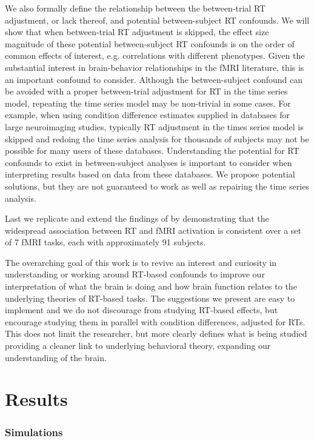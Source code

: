 \documentclass[titlepage,12pt] {article}
\begin{document}
We also formally define the relationship between the between-trial RT adjustment, or lack thereof, and potential between-subject RT confounds.  We will show that when between-trial RT adjustment is skipped, the effect size magnitude of these potential between-subject RT confounds is on the order of common effects of interest,  e.g. correlations with different phenotypes.  Given the substantial interest in brain-behavior relationships in the fMRI literature, this is an important confound to consider.   Although the between-subject confound can be avoided with a proper between-trial adjustment for RT in the time series model, repeating the time series model may be non-trivial in some cases.  For example, when using condition difference estimates supplied in databases for large neuroimaging studies, typically RT adjustment in the times series model is skipped and redoing the time series analysis for thousands of subjects may not be possible for many users of these databases.  Understanding the potential for RT confounds to exist in between-subject analyses is important to consider when interpreting results based on data from these databases.  We propose potential solutions, but they are not guaranteed to work as well as repairing the time series analysis.

Last we replicate and extend the findings of \citet{yarkoni_bold_2009} by demonstrating that the widespread association between RT and fMRI activation is consistent over a set of 7 fMRI tasks, each with approximately 91 subjects.  

The overarching goal of this work is to revive an interest and curiosity in understanding or working around RT-based confounds to improve our interpretation of what the brain is doing and how brain function relates to the underlying theories of RT-based tasks. The suggestions we present are easy to implement and we do not discourage from studying RT-based effects, but encourage studying them in parallel with condition differences, adjusted for RTs.  This does not limit the researcher, but more clearly defines what is being studied providing a cleaner link to underlying behavioral theory, expanding our understanding of the brain.



\section*{Results}

\subsubsection*{Simulations}
\end{document}
